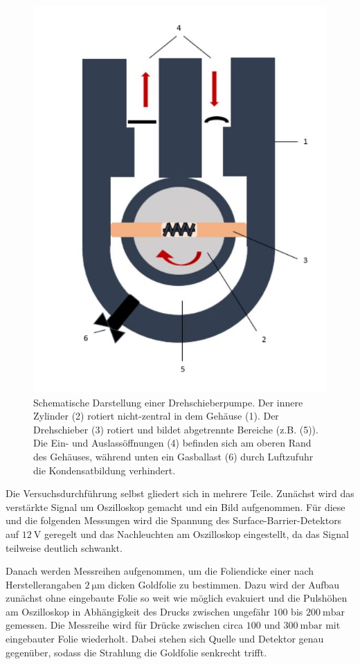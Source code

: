 \begin{figure}
  \centering
  \includegraphics[height=0.35\textheight]{images/pumpe.jpg}
  \caption{Schematische Darstellung einer Drehschieberpumpe. Der innere Zylinder (2) rotiert nicht-zentral in dem Gehäuse (1). Der Drehschieber (3) rotiert und bildet abgetrennte Bereiche (z.B. (5)). Die Ein- und Auslassöffnungen (4) befinden sich am oberen Rand des Gehäuses, während unten ein Gasballast (6) durch Luftzufuhr die Kondensatbildung verhindert. \cite{pumpe}}
  \label{fig:pumpe}
\end{figure}

Die Versuchsdurchführung selbst gliedert sich in mehrere Teile.
Zunächst wird das verstärkte Signal um Oszilloskop gemacht und ein Bild aufgenommen. Für diese und die folgenden Messungen wird die Spannung des Surface-Barrier-Detektors auf $\SI{12}{\volt}$ geregelt und das Nachleuchten am Oszilloskop eingestellt, da das Signal teilweise deutlich schwankt.

Danach werden Messreihen aufgenommen, um die Foliendicke einer nach Herstellerangaben $\SI{2}{\micro\meter}$ dicken Goldfolie zu bestimmen. Dazu wird der Aufbau zunächst ohne eingebaute Folie so weit wie möglich evakuiert und die Pulshöhen am Oszilloskop in Abhängigkeit des Drucks zwischen ungefähr $100$ bis $\SI{200}{\milli\bar}$ gemessen. Die Messreihe wird für Drücke zwischen circa $100$ und $\SI{300}{\milli\bar}$ mit eingebauter Folie wiederholt. Dabei stehen sich Quelle und Detektor genau gegenüber, sodass die Strahlung die Goldfolie senkrecht trifft.


